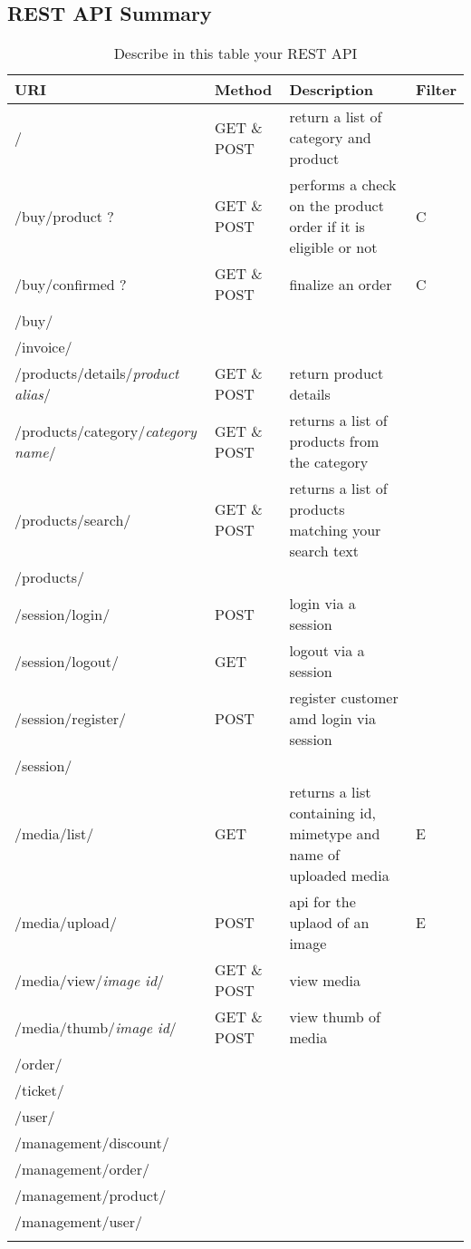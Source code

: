 \subsection{REST API Summary}


\begin{longtable}{|p{}|p{} |p{}|p{}|} 
\hline
\textbf{URI} & \textbf{Method} & \textbf{Description} & \textbf{Filter} \\\hline
/ & GET \& POST & return a list of category and product  &  \\\hline
/buy/product ? & GET \& POST & performs a check on the product order if it is eligible or not & C\\\hline
/buy/confirmed ? & GET \& POST & finalize an order & C\\\hline
/buy/ & & &\\\hline
/invoice/ & & &\\\hline
/products/details/\textit{product alias}/ & GET \& POST & return product details & \\\hline
/products/category/\textit{category name}/ & GET \& POST & returns a list of products from the category & \\\hline
/products/search/ & GET \& POST & returns a list of products matching your search text & \\\hline
/products/ & & &\\\hline
/session/login/ & POST & login via a session &  \\\hline
/session/logout/ & GET & logout via a session &  \\\hline
/session/register/ & POST & register customer amd login via session &  \\\hline
/session/ & & &\\\hline
/media/list/ & GET & returns a list containing id, mimetype and name of uploaded media & E\\\hline
/media/upload/ & POST &  api for the uplaod of an image & E\\\hline
/media/view/\textit{image id}/ & GET \& POST &  view media &  \\\hline
/media/thumb/\textit{image id}/ & GET \& POST & view thumb of media &  \\\hline
/order/ & & &\\\hline
/ticket/ & & &\\\hline
/user/ & & &\\\hline
/management/discount/ & & &\\\hline
/management/order/ & & &\\\hline
/management/product/ & & &\\\hline
/management/user/ & & &\\\hline

\caption{Describe in this table your REST API}
\label{tab:termGlossary}
\end{longtable}